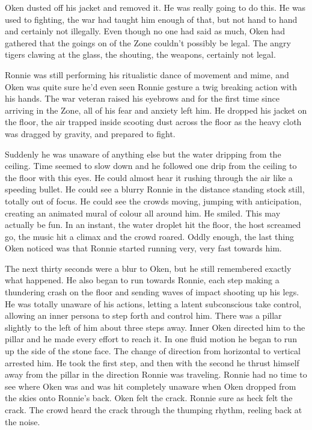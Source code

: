 Oken dusted off his jacket and removed it. He was really going to do this. He was used to fighting, the war had taught him enough of that, but not hand to hand and certainly not illegally. Even though no one had said as much, Oken had gathered that the goings on of the Zone couldn't possibly be legal. The angry tigers clawing at the glass, the shouting, the weapons, certainly not legal.

Ronnie was still performing his ritualistic dance of movement and mime, and Oken was quite sure he'd even seen Ronnie gesture a twig breaking action with his hands. The war veteran raised his eyebrows and for the first time since arriving in the Zone, all of his fear and anxiety left him. He dropped his jacket on the floor, the air trapped inside scooting dust across the floor as the heavy cloth was dragged by gravity, and prepared to fight.

Suddenly he was unaware of anything else but the water dripping from the ceiling. Time seemed to slow down and he followed one drip from the ceiling to the floor with this eyes. He could almost hear it rushing through the air like a speeding bullet. He could see a blurry Ronnie in the distance standing stock still, totally out of focus. He could see the crowds moving, jumping with anticipation, creating an animated mural of colour all around him. He smiled. This may actually be fun. In an instant, the water droplet hit the floor, the host screamed go, the music hit a climax and the crowd roared. Oddly enough, the last thing Oken noticed was that Ronnie started running very, very fast towards him.

The next thirty seconds were a blur to Oken, but he still remembered exactly what happened. He also began to run towards Ronnie, each step making a thundering crash on the floor and sending waves of impact shooting up his legs. He was totally unaware of his actions, letting a latent subconscious take control, allowing an inner persona to step forth and control him. There was a pillar slightly to the left of him about three steps away. Inner Oken directed him to the pillar and he made every effort to reach it. In one fluid motion he began to run up the side of the stone face. The change of direction from horizontal to vertical arrested him. He took the first step, and then with the second he thrust himself away from the pillar in the direction Ronnie was traveling. Ronnie had no time to see where Oken was and was hit completely unaware when Oken dropped from the skies onto Ronnie's back. Oken felt the crack. Ronnie sure as heck felt the crack. The crowd heard the crack through the thumping rhythm, reeling back at the noise.

